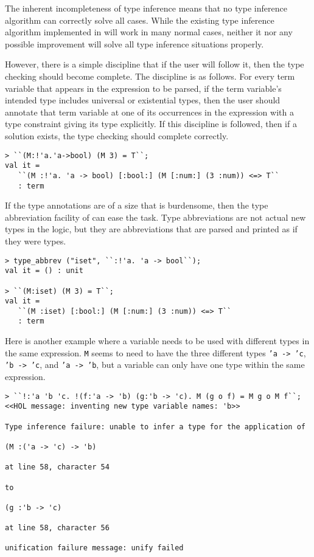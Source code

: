 The inherent incompleteness of type inference means that no type inference
algorithm can correctly solve all cases.  While the existing type inference
algorithm implemented in \HOLW{} will work in many normal cases, neither it
nor any possible improvement will solve all type inference situations properly.

However, there is a simple discipline that if the user will follow it,
then the type checking should become complete.  The discipline is
as follows.  For every term variable that appears in the expression to be
parsed, if the term variable's intended type includes universal or
existential types, then the user should annotate that term variable
at one of its occurrences in the expression
with a type constraint giving its type explicitly.
If this discipline is followed, then if a solution exists,
the type checking should complete correctly.
%
\begin{session}
\begin{verbatim}
> ``(M:!'a.'a->bool) (M 3) = T``;
val it =
   ``(M :!'a. 'a -> bool) [:bool:] (M [:num:] (3 :num)) <=> T``
   : term
\end{verbatim}
\end{session}

If the type annotations are of a size that is burdensome, then the
type abbreviation facility of \HOLW{} can ease the task.
Type abbreviations are not actual new types in the logic, but they are
abbreviations that are parsed and printed as if they were types.
%
\begin{session}
\begin{verbatim}
> type_abbrev ("iset", ``:!'a. 'a -> bool``);
val it = () : unit

> ``(M:iset) (M 3) = T``;
val it =
   ``(M :iset) [:bool:] (M [:num:] (3 :num)) <=> T``
   : term
\end{verbatim}
\end{session}


Here is another example where a variable needs to be used with different
types in the same expression.
\texttt{M} seems to need to have the three different types
\texttt{'a -> 'c}, \texttt{'b -> 'c}, and \texttt{'a -> 'b},
but a variable can only have one type within the same expression.

\begin{session}
\begin{verbatim}
> ``!:'a 'b 'c. !(f:'a -> 'b) (g:'b -> 'c). M (g o f) = M g o M f``;
<<HOL message: inventing new type variable names: 'b>>

Type inference failure: unable to infer a type for the application of

(M :('a -> 'c) -> 'b)

at line 58, character 54

to

(g :'b -> 'c)

at line 58, character 56

unification failure message: unify failed
\end{verbatim}
\end{session}

